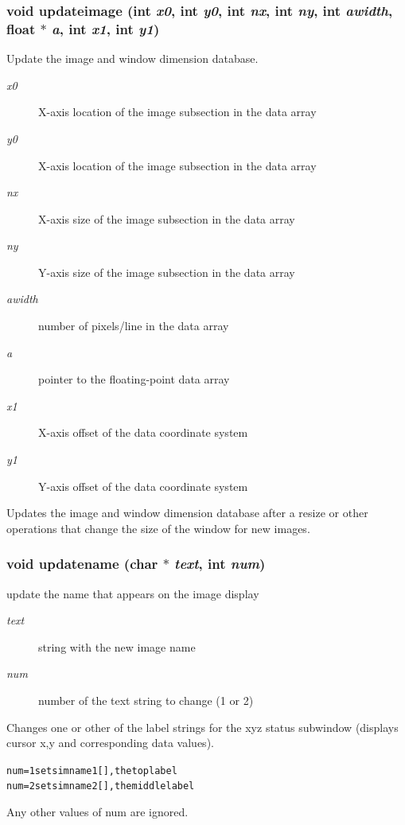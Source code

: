 \subsubsection{\setlength{\rightskip}{0pt plus 5cm}void updateimage (int {\em x0}, int {\em y0}, int {\em nx}, int {\em ny}, int {\em awidth}, float $\ast$ {\em a}, int {\em x1}, int {\em y1})}\label{xtvutils_8c_a189}


Update the image and window dimension database. 

\begin{Desc}
\item[Parameters:]
\begin{description}
\item[{\em x0}]X-axis location of the image subsection in the data array \item[{\em y0}]X-axis location of the image subsection in the data array \item[{\em nx}]X-axis size of the image subsection in the data array \item[{\em ny}]Y-axis size of the image subsection in the data array \item[{\em awidth}]number of pixels/line in the data array \item[{\em a}]pointer to the floating-point data array \item[{\em x1}]X-axis offset of the data coordinate system \item[{\em y1}]Y-axis offset of the data coordinate system\end{description}
\end{Desc}
Updates the image and window dimension database after a resize or other operations that change the size of the window for new images. 
\subsubsection{\setlength{\rightskip}{0pt plus 5cm}void updatename (char $\ast$ {\em text}, int {\em num})}\label{xtvutils_8c_a195}


update the name that appears on the image display 

\begin{Desc}
\item[Parameters:]
\begin{description}
\item[{\em text}]string with the new image name \item[{\em num}]number of the text string to change (1 or 2)\end{description}
\end{Desc}
Changes one or other of the label strings for the xyz status subwindow (displays cursor x,y and corresponding data values). \small\begin{alltt}
  num=1 sets imname1[], the top label
  num=2 sets imname2[], the middle label
  \end{alltt}\normalsize 
 Any other values of num are ignored.

